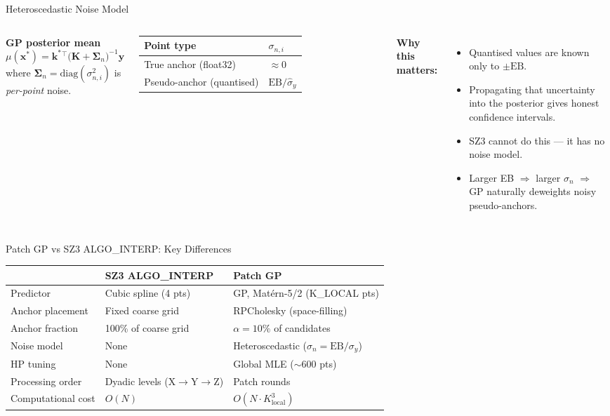\documentclass[10pt]{beamer}
\begin{document}
\begin{frame}{Heteroscedastic Noise Model}
  \begin{columns}
    \textbf{GP posterior mean}
    \[
      \mu(\mathbf{x}^*) = \mathbf{k}^*{}^\top
        \bigl(\mathbf{K}+\bm{\Sigma}_n\bigr)^{-1}\mathbf{y}
    \]
    where $\bm{\Sigma}_n = \mathrm{diag}(\sigma_{n,i}^2)$ is
    \emph{per-point} noise.
    \vspace{8pt}

    \begin{tabular}{ll}
      \toprule
      Point type & $\sigma_{n,i}$ \\
      \midrule
      True anchor (float32) & $\approx 0$ \\
      Pseudo-anchor (quantised) & $\mathrm{EB}/\hat{\sigma}_y$ \\
      \bottomrule
    \end{tabular}

    \textbf{Why this matters:}
    \begin{itemize}
      \item Quantised values are known only to $\pm\mathrm{EB}$.
      \item Propagating that uncertainty into the posterior
            gives honest confidence intervals.
      \item SZ3 cannot do this — it has no noise model.
      \item Larger EB $\Rightarrow$ larger $\sigma_n$
            $\Rightarrow$ GP naturally deweights noisy pseudo-anchors.
    \end{itemize}
  \end{columns}
\end{frame}

\begin{frame}{Patch GP vs SZ3 ALGO\_INTERP: Key Differences}
  \centering
  \small
  \begin{tabular}{lll}
    \toprule
    & \textbf{SZ3 ALGO\_INTERP} & \textbf{Patch GP} \\
    \midrule
    Predictor & Cubic spline (4 pts) & GP, Matérn-5/2 (K\_LOCAL pts) \\
    Anchor placement & Fixed coarse grid & RPCholesky (space-filling) \\
    Anchor fraction & 100\% of coarse grid & $\alpha=10\%$ of candidates \\
    Noise model & None & Heteroscedastic ($\sigma_n=\mathrm{EB}/\sigma_y$) \\
    HP tuning & None & Global MLE ($\sim$600 pts) \\
    Processing order & Dyadic levels (X$\to$Y$\to$Z) & Patch rounds \\
    Computational cost & $O(N)$ & $O(N\cdot K_\mathrm{local}^3)$ \\
    \bottomrule
  \end{tabular}
\end{frame}
\end{document}
